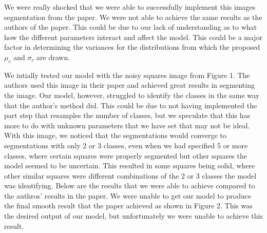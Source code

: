 \documentclass[11pt]{article}
\begin{document}
We were really shocked that we were able to successfully implement this images segmentation from the paper.
We were not able to achieve the same results as the authors of the paper.
This could be due to our lack of understanding as to what how the different parameters interact and affect the model.
This could be a major factor in determining the variances for the distributions from which the proposed $\mu_{c}$ and $\sigma_{c}$ are drawn.

We intially tested our model with the noisy squares image from Figure 1.
The authors used this image in their paper and achieved great results in segmenting the image.
Our model, however, struggled to identify the classes in the same way that the author's method did.
This could be due to not having implemented the part step that resamples the number of classes, but we speculate that this has more to do with unknown parameters that we have set that may not be ideal.
With this image, we noticed that the segmentations would converge to segmentations with only 2 or 3 classes, even when we had specified 5 or more classes, where certain squares were properly segmented but other squares the model seemed to be uncertain.
This resulted in some squares being solid, where other similar squares were different combinations of the 2 or 3 classes the model was identifying.
Below are the results that we were able to achieve compared to the authros' results in the paper.
We were unable to get our model to produce the final smooth result that the paper achieved as shown in Figure 2.
This was the desired output of our model, but unfortunately we were unable to achieve this result.
\end{document}
